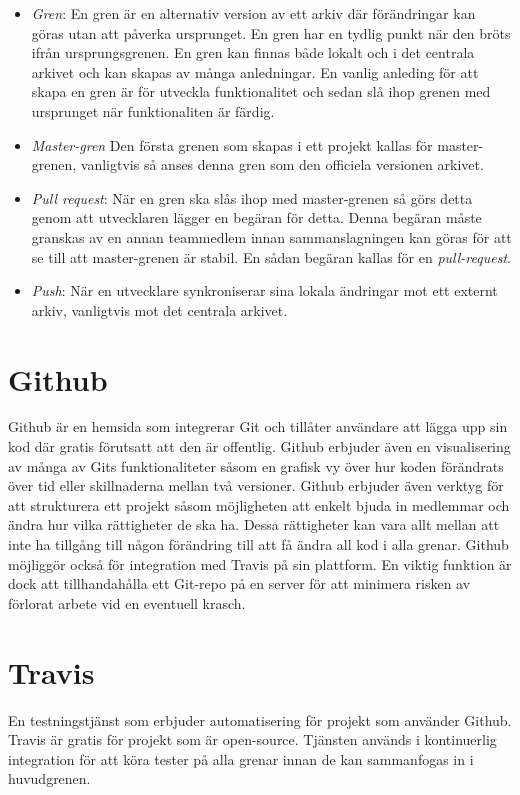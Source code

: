 \begin{itemize}
	\item \textit{Gren}: En gren är en alternativ version av ett arkiv där förändringar kan göras utan att påverka ursprunget. En gren har en tydlig punkt när den bröts ifrån ursprungsgrenen. En gren kan finnas både lokalt och i det centrala arkivet och kan skapas av många anledningar. En vanlig anleding för att skapa en gren är för utveckla funktionalitet och sedan slå ihop grenen med ursprunget när funktionaliten är färdig.
	
	\item\textit{Master-gren} Den första grenen som skapas i ett projekt kallas för master-grenen, vanligtvis så anses denna gren som den officiela versionen arkivet.

	\item \textit{Pull request}: När en gren ska slås ihop med master-grenen så görs detta genom att utvecklaren lägger en begäran för detta. Denna begäran måste granskas av en annan teammedlem innan sammanslagningen kan göras för att se till att master-grenen är stabil. En sådan begäran kallas för en \textit{pull-request}.
	
	\item \textit{Push}: När en utvecklare synkroniserar sina lokala ändringar mot ett externt arkiv, vanligtvis mot det centrala arkivet.
\end{itemize}


\section{Github}
Github är en hemsida som integrerar Git och tillåter användare att lägga upp sin kod där gratis förutsatt att den är offentlig.\cite{Github} Github erbjuder även en visualisering av många av Gits funktionaliteter såsom en grafisk vy över hur koden förändrats över tid eller skillnaderna mellan två versioner. Github erbjuder även verktyg för att strukturera ett projekt såsom möjligheten att enkelt bjuda in medlemmar och ändra hur vilka rättigheter de ska ha. Dessa rättigheter kan vara allt mellan att inte ha tillgång till någon förändring till att få ändra all kod i alla grenar. Github möjliggör också för integration med Travis på sin plattform. En viktig funktion är dock att tillhandahålla ett Git-repo på en server för att minimera risken av förlorat arbete vid en eventuell krasch.

\section{Travis}
En testningstjänst som erbjuder automatisering för projekt som använder Github.\cite{Travis} Travis är gratis för projekt som är open-source. Tjänsten används i kontinuerlig integration för att köra tester på alla grenar innan de kan sammanfogas in i huvudgrenen.

